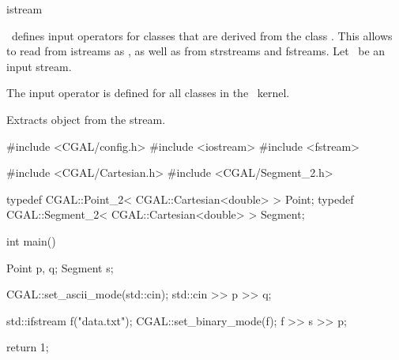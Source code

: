 \newpage
\begin{ccClass} {istream}

\ccDefinition
\cgal\  defines input operators for classes that are derived
from the class . This allows to read from istreams
as , as well as from strstreams and fstreams.
Let \ccVar\ be an input stream.

\ccOperations

The input operator is defined for all classes in the \cgal\ kernel.

{Extracts object  from the stream.}


\ccExample

\begin{cprog}

#include <CGAL/config.h>
#include <iostream>
#include <fstream>

#include <CGAL/Cartesian.h>
#include <CGAL/Segment_2.h>

typedef CGAL::Point_2< CGAL::Cartesian<double> >     Point;
typedef CGAL::Segment_2< CGAL::Cartesian<double> >   Segment;

int
main()
{
    Point p, q;
    Segment s;

    CGAL::set_ascii_mode(std::cin);
    std::cin >> p >> q;

    std::ifstream f("data.txt");
    CGAL::set_binary_mode(f);
    f >> s >> p;

    return 1;
}
\end{cprog} 
\end{ccClass} 
